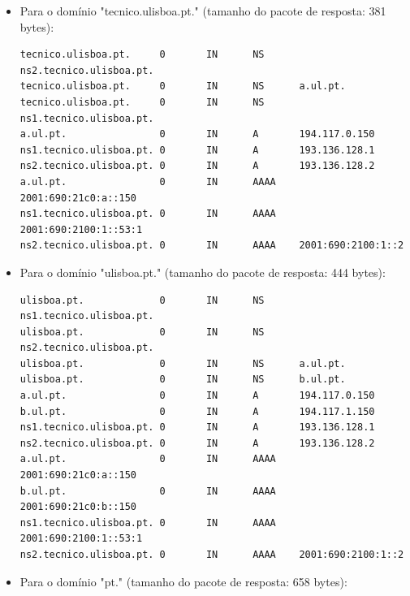\begin{itemize}
    \item Para o domínio "tecnico.ulisboa.pt." (tamanho do pacote de resposta: 381 bytes):


    \begin{verbatim}
tecnico.ulisboa.pt.     0       IN      NS      ns2.tecnico.ulisboa.pt.
tecnico.ulisboa.pt.     0       IN      NS      a.ul.pt.
tecnico.ulisboa.pt.     0       IN      NS      ns1.tecnico.ulisboa.pt.
a.ul.pt.                0       IN      A       194.117.0.150
ns1.tecnico.ulisboa.pt. 0       IN      A       193.136.128.1
ns2.tecnico.ulisboa.pt. 0       IN      A       193.136.128.2
a.ul.pt.                0       IN      AAAA    2001:690:21c0:a::150
ns1.tecnico.ulisboa.pt. 0       IN      AAAA    2001:690:2100:1::53:1
ns2.tecnico.ulisboa.pt. 0       IN      AAAA    2001:690:2100:1::2
\end{verbatim}

    \item Para o domínio "ulisboa.pt." (tamanho do pacote de resposta: 444 bytes):


    \begin{verbatim}
ulisboa.pt.             0       IN      NS      ns1.tecnico.ulisboa.pt.
ulisboa.pt.             0       IN      NS      ns2.tecnico.ulisboa.pt.
ulisboa.pt.             0       IN      NS      a.ul.pt.
ulisboa.pt.             0       IN      NS      b.ul.pt.
a.ul.pt.                0       IN      A       194.117.0.150
b.ul.pt.                0       IN      A       194.117.1.150
ns1.tecnico.ulisboa.pt. 0       IN      A       193.136.128.1
ns2.tecnico.ulisboa.pt. 0       IN      A       193.136.128.2
a.ul.pt.                0       IN      AAAA    2001:690:21c0:a::150
b.ul.pt.                0       IN      AAAA    2001:690:21c0:b::150
ns1.tecnico.ulisboa.pt. 0       IN      AAAA    2001:690:2100:1::53:1
ns2.tecnico.ulisboa.pt. 0       IN      AAAA    2001:690:2100:1::2
\end{verbatim}

    \item Para o domínio "pt." (tamanho do pacote de resposta: 658 bytes):



\end{itemize}
